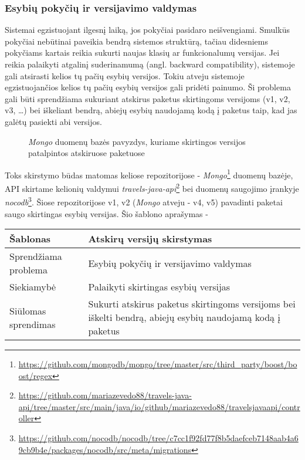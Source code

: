 \subsubsection{Esybių pokyčių ir versijavimo valdymas}
Sistemai egzistuojant ilgesnį laiką, jos pokyčiai pasidaro neišvengiami.
Smulkūs pokyčiai nebūtinai paveikia bendrą sistemos struktūrą, tačiau
didesniems pokyčiams kartais reikia sukurti naujas klasių ar funkcionalumų versijas. Jei reikia palaikyti atgalinį
suderinamumą (angl. backward compatibility), sistemoje gali atsirasti kelios tų pačių esybių versijos.
Tokiu atveju sistemoje egzistuojančios kelios tų pačių esybių versijos gali pridėti painumo.
Ši problema gali būti sprendžiama sukuriant atskirus paketus skirtingoms
versijoms (v1, v2, v3, \ldots) bei iškeliant bendrą, abiejų esybių naudojamą kodą į paketus taip, kad jas galėtų pasiekti abi versijos.
\begin{figure}[H]
    \snugshade
    \endsnugshade
    \caption{\textit{Mongo} duomenų bazės pavyzdys, kuriame skirtingos versijos patalpintos atskiruose paketuose}
\end{figure}
Toks skirstymo būdas matomas keliose repozitorijose - \textit{Mongo}\footnote{\url{https://github.com/mongodb/mongo/tree/master/src/third_party/boost/boost/regex}} duomenų bazėje,
API skirtame kelionių valdymui \textit{travels-java-api}\footnote{\url{https://github.com/mariazevedo88/travels-java-api/tree/master/src/main/java/io/github/mariazevedo88/travelsjavaapi/controller}}
 bei duomenų saugojimo įrankyje \textit{nocodb}\footnote{\url{https://github.com/nocodb/nocodb/tree/c7cc1f92fd77f8b5daefceb7148aab4a69cb9b4e/packages/nocodb/src/meta/migrations}}.
Šiose repozitorijose v1, v2 (\textit{Mongo} atveju - v4, v5) pavadinti paketai saugo skirtingas esybių versijas.
Šio šablono aprašymas -
\begin{center}
    \begin{tabular}{|p{5cm}|p{10cm}|}
        \hline
        Šablonas &  Atskirų versijų skirstymas \\ [0.5ex]
        \hline\hline
        Sprendžiama problema & Esybių pokyčių ir versijavimo valdymas\\
        \hline
        Siekiamybė &  Palaikyti skirtingas esybių versijas \\
        \hline
        Siūlomas sprendimas & Sukurti atskirus paketus skirtingoms versijoms bei iškelti bendrą, abiejų esybių naudojamą kodą į paketus \\
        \hline
    \end{tabular}
\end{center}

